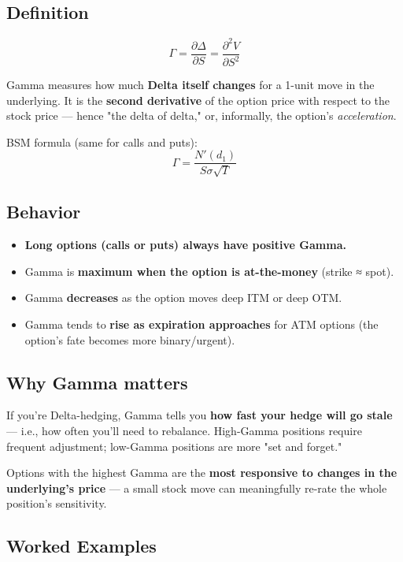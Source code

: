 \documentclass[12pt,openany]{book}
\theoremstyle{definition}
\theoremstyle{remark}
\begin{document}
\subsection{Definition}

\[
\Gamma = \frac{\partial \Delta}{\partial S} = \frac{\partial^2 V}{\partial S^2}
\]

Gamma measures how much \textbf{Delta itself changes} for a 1-unit move in the underlying. It is the \textbf{second derivative} of the option price with respect to the stock price — hence "the delta of delta," or, informally, the option's \emph{acceleration}.

BSM formula (same for calls and puts):
\[
\Gamma = \frac{N'(d_1)}{S\sigma\sqrt{T}}
\]

\subsection{Behavior}

\begin{itemize}
\item \textbf{Long options (calls or puts) always have positive Gamma.}
\item Gamma is \textbf{maximum when the option is at-the-money} (strike ≈ spot).
\item Gamma \textbf{decreases} as the option moves deep ITM or deep OTM.
\item Gamma tends to \textbf{rise as expiration approaches} for ATM options (the option's fate becomes more binary/urgent).
\end{itemize}

\subsection{Why Gamma matters}

If you're Delta-hedging, Gamma tells you \textbf{how fast your hedge will go stale} — i.e., how often you'll need to rebalance. High-Gamma positions require frequent adjustment; low-Gamma positions are more "set and forget."

Options with the highest Gamma are the \textbf{most responsive to changes in the underlying's price} — a small stock move can meaningfully re-rate the whole position's sensitivity.

\subsection{Worked Examples}
\end{document}
